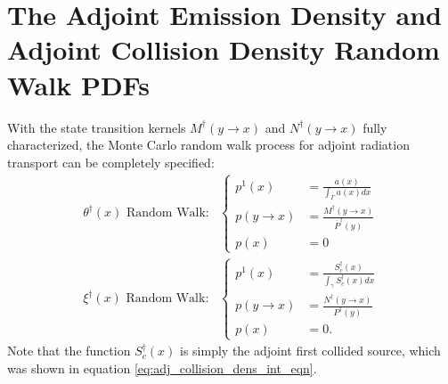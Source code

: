 \section{The Adjoint Emission Density and Adjoint Collision Density Random Walk PDFs}
With the state transition kernels $M^{\dagger}(y \to x)$ and 
$N^{\dagger}(y \to x)$ fully characterized, the Monte Carlo random walk process
for adjoint radiation transport can be completely specified:
\begin{align}
  \theta^{\dagger}(x)\text{ Random Walk:}&
  \begin{cases}
    p^1(x) & = \frac{a(x)}{\int_{\Gamma} a(x)dx} \\
    p(y \to x) & = \frac{M^{\dagger}(y \to x)}{\overline{P}^{\dagger}(y)} \\
    p(x) & = 0
  \end{cases}
  \label{eq:mc_random_walk_adj_emission_dens} \\
  \xi^{\dagger}(x)\text{ Random Walk:}&
  \begin{cases}
    p^1(x) & = \frac{S_c^{\dagger}(x)}{\int_{\gamma} S_c^{\dagger}(x)dx} \\
    p(y \to x) & = \frac{N^{\dagger}(y \to x)}{P^{\dagger}(y)} \\
    p(x) & = 0.
  \end{cases}
  \label{eq:mc_random_walk_adj_collision_dens}
\end{align}
Note that the function $S_c^{\dagger}(x)$ is simply the adjoint first collided
source, which was shown in equation \ref{eq:adj_collision_dens_int_eqn}.

